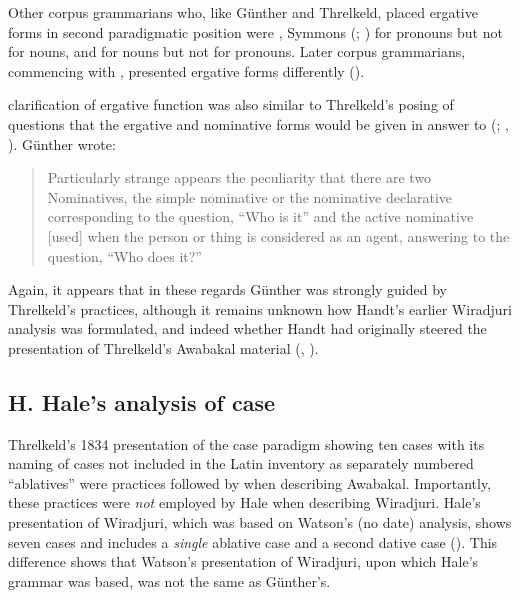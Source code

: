 Other corpus grammarians who, like Günther and Threlkeld, placed ergative forms in second paradigmatic position were \citet[6]{ridley_kamilaroi_1875}, Symmons (\citeyear[xiii]{symmons_grammatical_1841}; \citeyear[52]{symmons_grammar_1892}) for pronouns but not for nouns, and \citet[2--3]{moorhouse_vocabulary_1846} for nouns but not for pronouns. Later corpus grammarians, commencing with \citet{teichelmann_outlines_1840}, presented ergative forms differently ().

 clarification of ergative function was also similar to Threlkeld’s posing of questions that the ergative and nominative forms would be given in answer to (; , ).  Günther wrote:

\begin{quote}
    Particularly strange appears the peculiarity that there are two Nominatives, the simple nominative or the nominative declarative corresponding to the question, “Who is it” and the active nominative [used] when the person or thing is considered as an agent, answering to the question, “Who does it?” \end{quote}

Again, it appears that in these regards Günther was strongly guided by Threlkeld’s practices, although it remains unknown how Handt’s earlier Wiradjuri analysis was formulated, and indeed whether Handt had originally steered the presentation of Threlkeld’s Awabakal material (, ).

\subsection{H. Hale’s analysis of case}
\label{sec:key:4.4.5}

Threlkeld’s 1834 presentation of the case paradigm showing ten cases with its naming of cases not included in the Latin inventory as separately numbered “ablatives” were practices followed by \citet{hale_languages_1846} when describing Awabakal. Importantly, these practices were \textit{not} employed by Hale when describing Wiradjuri. Hale’s presentation of Wiradjuri, which was based on Watson’s (no date) analysis, shows seven cases and includes a \textit{single} ablative case and a second dative case (). This difference shows that Watson’s presentation of Wiradjuri, upon which Hale’s grammar was based, was not the same as Günther’s. 

